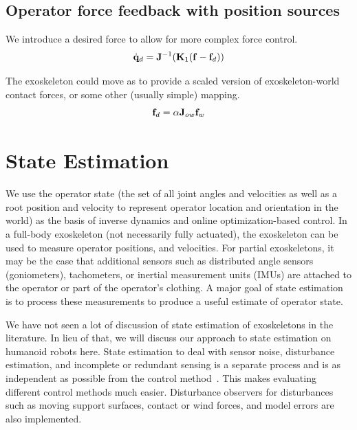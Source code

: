 \documentclass[letterpaper,12pt,fullpage]{article}
\begin{document}
\subsection{Operator force feedback with position sources}

We introduce a desired force to allow for more complex force control.
\begin{equation}
\dot{{\bf q}}_d = {\bf J}^{-1} ({\bf K}_1 ({\bf f} - {\bf f}_d))
\end{equation}

The exoskeleton could move as to provide a scaled version of exoskeleton-world
contact forces, or some other (usually simple) mapping. 
\begin{equation}
{\bf f}_d = \alpha {\bf J}_{ow} {\bf f}_w
\end{equation}

\section{State Estimation}

We use the operator state (the set of all joint angles and velocities
as well as a root position and velocity to represent operator location
and orientation in the world) as the basis of inverse dynamics and
online optimization-based control.
In a full-body exoskeleton
(not necessarily fully actuated), the
exoskeleton can be used to measure operator positions, and velocities.
For partial exoskeletons,
it may be the case that additional sensors such as distributed 
angle sensors (goniometers), tachometers, or inertial measurement units (IMUs)
are attached to the operator or part of the operator's clothing.
A major goal of state estimation is to process these measurements to
produce a useful estimate of operator state.

We have not seen a lot of discussion of state estimation of exoskeletons in
the literature.
In lieu of that,
we will discuss our approach to state estimation on humanoid robots here.
State estimation to deal with sensor noise,
disturbance estimation, and incomplete or
redundant sensing is a separate process and is as independent as possible
from the control method~\cite{certainty-eq,separation-prin}.
This makes evaluating different control methods much easier.
Disturbance observers for disturbances such as
moving support surfaces, contact or wind forces, and model errors
are also implemented.
\end{document}
